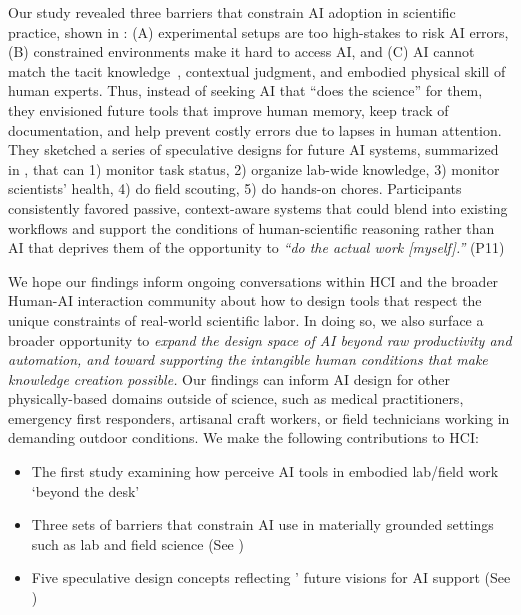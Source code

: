 Our study revealed three barriers that constrain AI adoption in scientific practice, shown in : (A) experimental setups are too high-stakes to risk AI errors, (B) constrained environments make it hard to access AI, and (C) AI cannot match the tacit knowledge~\cite{polanyi2009tacit}, contextual judgment, and embodied physical skill of human experts. Thus, instead of seeking AI that ``does the science'' for them, they envisioned future tools that improve human memory, keep track of documentation, and help prevent costly errors due to lapses in human attention. They sketched a series of speculative designs for future AI systems, summarized in , that can 1) monitor task status, 2) organize lab-wide knowledge, 3) monitor scientists' health, 4) do field scouting, 5) do hands-on chores. Participants consistently favored passive, context-aware systems that could blend into existing workflows and support the conditions of human-scientific reasoning rather than AI that deprives them of the opportunity to \emph{``do the actual work [myself].''} (P11)

We hope our findings inform ongoing conversations within HCI and the broader Human-AI interaction community about how to design tools that respect the unique constraints of real-world scientific labor. In doing so, we also surface a broader opportunity to \emph{expand the design space of AI beyond raw productivity and automation, and toward supporting the intangible human conditions that make knowledge creation possible.} Our findings can inform AI design for other physically-based domains outside of science, such as medical practitioners, emergency first responders, artisanal craft workers, or field technicians working in demanding outdoor conditions. We make the following contributions to HCI:

\begin{itemize}
  \item The first study examining how  perceive AI tools in embodied lab/field work `beyond the desk'
  \item Three sets of barriers that constrain AI use in materially grounded settings such as lab and field science (See )
  \item Five speculative design concepts reflecting ’ future visions for AI support (See )
\end{itemize}

